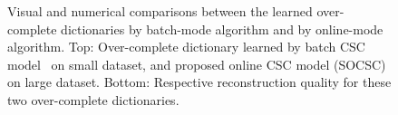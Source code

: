 \begin{figure}[h]
  \caption{ Visual and numerical comparisons between the learned over-complete dictionaries by batch-mode algorithm and by online-mode algorithm. Top: Over-complete dictionary learned by batch CSC model~\cite{heide2015fast} on small dataset, and proposed online CSC model (SOCSC) on large dataset. Bottom: Respective reconstruction quality for these two over-complete dictionaries.}
  \label{fig:overCompleteDic-dataset}
\end{figure} 